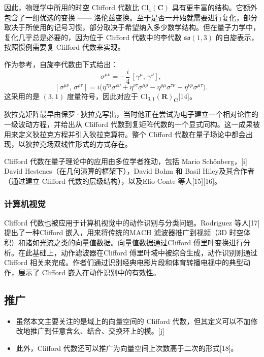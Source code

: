 因此，物理学中所用的时空 Clifford 代数比 $\mathrm{Cl}_4(\mathbf{C})$ 具有更丰富的结构。它额外包含了一组优选的变换 —— 洛伦兹变换。至于是否一开始就需要进行复化，部分取决于所使用的记号习惯，部分取决于希望纳入多少数学结构。但在量子力学中，复化几乎总是必要的，因为位于 Clifford 代数中的李代数 $\mathfrak{so}(1,3)$ 的自旋表示，按照惯例需要复 Clifford 代数来实现。

作为参考，自旋李代数由下式给出：
$$
\sigma^{\mu\nu} = -\frac{i}{4}\,[\gamma^\mu,\, \gamma^\nu], ~
$$
$$
[\sigma^{\mu\nu},\, \sigma^{\rho\tau}] = i \big( \eta^{\tau\mu}\sigma^{\rho\nu} + \eta^{\nu\tau}\sigma^{\mu\rho} - \eta^{\rho\mu}\sigma^{\tau\nu} - \eta^{\nu\rho}\sigma^{\mu\tau} \big).~
$$
这采用的是 $(3,1)$ 度量符号，因此对应于 $\mathrm{Cl}_{3,1}(\mathbf{R})_{\mathbf{C}}$[14]。

狄拉克矩阵最早由保罗·狄拉克写出，当时他正在尝试为电子建立一个相对论性的一级波动方程，并给出从 Clifford 代数到复矩阵代数的一个显式同构。这一成果被用来定义狄拉克方程并引入狄拉克算符。整个 Clifford 代数在量子场论中都会出现，以狄拉克场双线性形式的方式存在。

Clifford 代数在量子理论中的应用由多位学者推动，包括 Mario Schönberg，[i] David Hestenes（在几何演算的框架下），David Bohm 和 Basil Hiley及其合作者（通过建立 Clifford 代数的层级结构），以及Elio Conte 等人[15][16]。
\subsubsection{计算机视觉}
Clifford 代数也被应用于计算机视觉中的动作识别与分类问题。Rodriguez 等人[17]提出了一种Clifford 嵌入，用来将传统的MACH 滤波器推广到视频（3D 时空体积）和诸如光流之类的向量值数据。向量值数据通过Clifford 傅里叶变换进行分析。在此基础上，动作滤波器在Clifford 傅里叶域中被综合生成，动作识别则通过Clifford 相关来完成。作者们通过识别经典电影片段和体育转播电视中的典型动作，展示了 Clifford 嵌入在动作识别中的有效性。
\subsection{推广}
\begin{itemize}
\item 虽然本文主要关注的是域上的向量空间的 Clifford 代数，但其定义可以不加修改地推广到任意含幺、结合、交换环上的模。[j]
\item 此外，Clifford 代数还可以推广为向量空间上次数高于二次的形式[18]。
\end{itemize}
